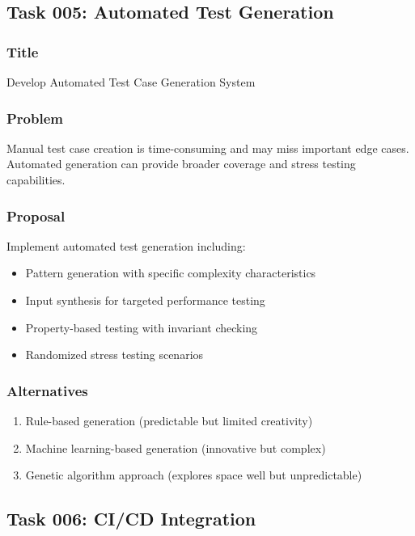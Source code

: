 \documentclass[11pt,a4paper]{article}
\begin{document}
\subsection{Task 005: Automated Test Generation}

\subsubsection{Title}
Develop Automated Test Case Generation System

\subsubsection{Problem}
Manual test case creation is time-consuming and may miss important edge cases. Automated generation can provide broader coverage and stress testing capabilities.

\subsubsection{Proposal}
Implement automated test generation including:
\begin{itemize}
    \item Pattern generation with specific complexity characteristics
    \item Input synthesis for targeted performance testing
    \item Property-based testing with invariant checking
    \item Randomized stress testing scenarios
\end{itemize}

\subsubsection{Alternatives}
\begin{enumerate}
    \item Rule-based generation (predictable but limited creativity)
    \item Machine learning-based generation (innovative but complex)
    \item Genetic algorithm approach (explores space well but unpredictable)
\end{enumerate}

\subsection{Task 006: CI/CD Integration}
\end{document}
